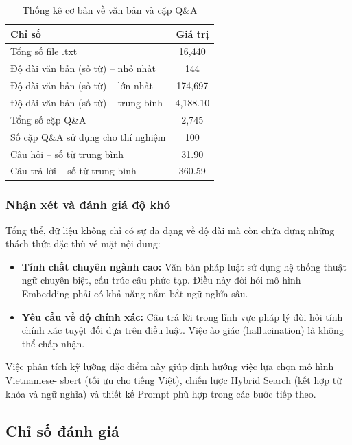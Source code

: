 \begin{table}[H]
\centering
\caption{Thống kê cơ bản về văn bản và cặp Q\&A}
\begin{tabular}{lc}
  \toprule
  \textbf{Chỉ số} & \textbf{Giá trị} \\
  \midrule
  Tổng số file .txt                         & 16,440   \\
  Độ dài văn bản (số từ) -- nhỏ nhất        & 144      \\
  Độ dài văn bản (số từ) -- lớn nhất        & 174,697  \\
  Độ dài văn bản (số từ) -- trung bình      & 4,188.10 \\
  Tổng số cặp Q\&A                          & 2,745    \\
  Số cặp Q\&A sử dụng cho thí nghiệm        & 100      \\
  Câu hỏi -- số từ trung bình               & 31.90    \\
  Câu trả lời -- số từ trung bình           & 360.59   \\
  \bottomrule
\end{tabular}
\end{table}

\subsubsection{Nhận xét và đánh giá độ khó}

Tổng thể, dữ liệu không chỉ có sự đa dạng về độ dài mà còn chứa đựng những thách thức đặc thù về mặt nội dung:

\begin{itemize}
  \item \textbf{Tính chất chuyên ngành cao:} Văn bản pháp luật sử dụng hệ thống thuật ngữ chuyên biệt, cấu trúc câu phức tạp. Điều này đòi hỏi mô hình Embedding phải có khả năng nắm bắt ngữ nghĩa sâu.
  \item \textbf{Yêu cầu về độ chính xác:} Câu trả lời trong lĩnh vực pháp lý đòi hỏi tính chính xác tuyệt đối dựa trên điều luật. Việc ảo giác (hallucination) là không thể chấp nhận.
\end{itemize}
Việc phân tích kỹ lưỡng đặc điểm này giúp định hướng việc lựa chọn mô hình Vietnamese-
sbert (tối ưu cho tiếng Việt), chiến lược Hybrid Search (kết hợp từ khóa và ngữ nghĩa) và thiết kế Prompt phù hợp trong các bước tiếp theo.

\subsection{Chỉ số đánh giá}

